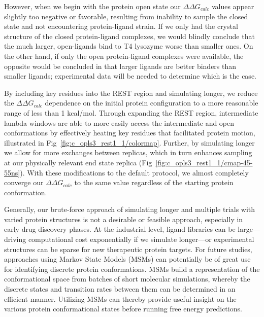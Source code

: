 \documentclass[journal=jctcce,manuscript=article]{achemso}
\begin{document}
However, when we begin with the protein open state our $\Delta\Delta G_{calc}$ values appear slightly too negative or favorable, resulting from inability to sample the closed state and not encountering protein-ligand strain. 
If we only had the crystal structure of the closed protein-ligand complexes, we would blindly conclude that the much larger, open-ligands bind to T4 lysozyme worse than smaller ones.
On the other hand, if only the open protein-ligand complexes were available, the opposite would be concluded in that larger ligands are better binders than smaller ligands; experimental data will be needed to determine which is the case. 

By including key residues into the REST region and simulating longer, we reduce the $\Delta\Delta G_{calc}$ dependence on the initial protein configuration to a more reasonable range of less than 1 kcal/mol.
Through expanding the REST region, intermediate lambda windows are able to more easily access the intermediate and open conformations by effectively heating key residues that facilitated protein motion, illustrated in Fig~\ref{fig:c_opls3_rest1_1/colormap}.
Further, by simulating longer we allow for more exchanges between replicas, which in turn enhances sampling at our physically relevant end state replica (Fig~\ref{fig:c_opls3_rest1_1/cmap-45-55ns}).   
With these modifications to the default protocol, we almost completely converge our $\Delta\Delta G_{calc}$ to the same value regardless of the starting protein conformation.

Generally, our brute-force approach of simulating longer and multiple trials with varied protein structures is not a desirable or feasible approach, especially in early drug discovery phases.
At the industrial level, ligand libraries can be large---driving computational cost exponentially if we simulate longer---or experimental structures can be sparse for new therapeutic protein targets.
For future studies, approaches using Markov State Models (MSMs)\cite{MSM} can potentially be of great use for identifying discrete protein conformations.
MSMs build a representation of the conformational space from batches of short molecular simulations, whereby the discrete states and transition rates between them can be determined in an efficient manner.
Utilizing MSMs can thereby provide useful insight on the various protein conformational states before running free energy predictions.
\end{document}
